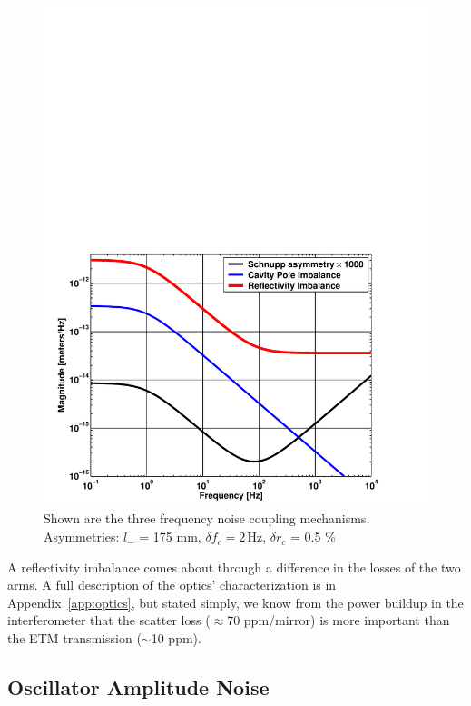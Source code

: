 \begin{figure}[!h]
\centerline{
\includegraphics[angle=0,width=6.5in]{Figures/Chap4/FreqNoiseCoupling.pdf}}
\caption[Frequency Noise Couplings]{Shown are the three frequency noise
         coupling mechanisms. Asymmetries: $l_-$ = 175 mm,
         $\delta f_{c} = 2 \, \mbox{Hz}$, $\delta r_{c}$ = 0.5 \%}
\label{fig:FreqNoise}
\end{figure}
A reflectivity imbalance comes about through
a difference in the losses of the two arms. A full description of the 
optics' characterization is in Appendix~\ref{app:optics},
but stated simply, we know from the power buildup in the interferometer that
the scatter loss ($\approx$70 ppm/mirror) is more important than the ETM transmission
($\sim$10 ppm). 



\subsection{Oscillator Amplitude Noise}


